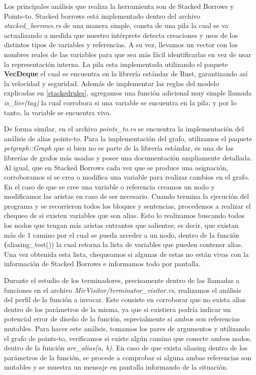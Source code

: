 Los principales análisis que realiza la herramienta son de Stacked Borrows y Points-to. Stacked borrows está implementado dentro del archivo \textit{stacked\_borrows.rs} de una manera simple, consta de una pila la cual se va actualizando a medida que nuestro intérprete detecta creaciones y usos de los distintos tipos de variables y referencias. A su vez, llevamos un vector con los nombres reales de las variables para que sea más fácil identificarlas en vez de usar la representación interna. La pila esta implementada utilizando el paquete \textbf{VecDeque} el cual se encuentra en la librería estándar de Rust, garantizando así la velocidad y seguridad. Además de implementar las reglas del modelo explicadas en \ref{stackedrules}, agregamos una función adicional muy simple llamada \textit{is\_live(tag)} la cual corrobora si una variable se encuentra en la pila; y por lo tanto, la variable se encuentra viva.

De forma similar, en el archivo \textit{points\_to.rs} se encuentra la implementación del análisis de alias points-to.
Para la implementación del grafo, utilizamos el paquete \textit{petgraph::Graph} que si bien no es parte de la librería estándar, es una de las librerías de grafos más usadas y posee una documentación ampliamente detallada. Al igual, que en Stacked Borrows cada vez que se produce una asignación, corroboramos si se crea o modifica una variable para realizar cambios en el grafo. En el caso de que se cree una variable o referencia creamos un nodo y modificamos las aristas en caso de ser necesario. Cuando termina la ejecución del programa y se recorrieron todos los bloques y sentencias, procedemos a realizar el chequeo de si existen variables que son alias. Esto lo realizamos buscando todos los nodos que tengan más aristas entrantes que salientes; es decir, que existan más de 1 camino por el cual se pueda acceder a un nodo, dentro de la función \textbf(aliasing\_test()) la cual retorna la lista de variables que pueden contener alias. Una vez obtenida esta lista, chequeamos si algunas de estas no están vivas con la información de Stacked Borrows e informamos todo por pantalla.

Durante el estudio de los terminadores, precisamente dentro de las llamadas a funciones en el archivo \textit{MirVisitor/terminator\_visitor.rs}, realizamos el análisis del perfil de la función a invocar. Este consiste en corroborar que no exista alias dentro de los parámetros de la misma, ya que si existiera podría indicar un potencial error de diseño de la función, especialmente si ambos son referencias mutables. Para hacer este análisis, tomamos los pares de argumentos y utilizando el grafo de points-to, verificamos si existe algún camino que conecte ambos nodos, dentro de la función \textit{are\_alias(a, b)}. En caso de que exista aliasing dentro de los parámetros de la función, se procede a comprobar si alguna ambas referencias son mutables y se muestra un mensaje en pantalla informando de la situación.


